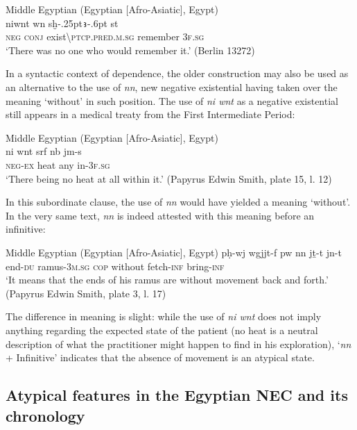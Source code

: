 \documentclass[output=paper]{langsci/langscibook}
\newcommand{\ꜥ}{ʿ}
\newcommand{\ꜣ}{\kern-.25pt\texttt{ꜣ}\kern-.6pt}
\begin{document}
\ea Middle Egyptian (Egyptian [Afro-Asiatic], Egypt) \label{ex:AE48}\\
    \gll niwnt wn sḫ{\ꜣ} st\\
    \textsc{neg} \textsc{conj} exist\textbackslash\textsc{ptcp.pred.m.sg} remember \textsc{3f.sg}\\ 
    \glt ‘There was no one who would remember it.’ (Berlin 13272) 
\z
 
In a syntactic context of dependence, the older construction may also be used as an alternative to the use of \textit{nn}, new negative existential having taken over the meaning ‘without’ in such position. The use of \textit{ni wnt} as a negative existential still appears in a medical treaty from the First Intermediate Period:  
 
\ea Middle Egyptian (Egyptian [Afro-Asiatic], Egypt) \label{ex:AE49}\\
    \gll ni wnt srf nb jm-s\\
    \textsc{neg-ex} heat any in-\textsc{3f.sg}\\ 
    \glt ‘There being no heat at all within it.’ (Papyrus Edwin Smith, plate 15, l. 12) 
\z 
 
In this subordinate clause, the use of \textit{nn} would have yielded a meaning ‘without’. In the very same text, \textit{nn} is indeed attested with this meaning before an infinitive:  
 
\ea Middle Egyptian (Egyptian [Afro-Asiatic], Egypt) \label{ex:AE50}
    \gll pḥ-wj wgjjt-f pw nn jṯ-t jn-t\\
    end-\textsc{du} ramus-\textsc{3m.sg} \textsc{cop} without fetch-\textsc{inf} bring-\textsc{inf}\\ 
    \glt ‘It means that the ends of his ramus are without movement back and forth.’ (Papyrus Edwin Smith, plate 3, l. 17) 
\z 
 
The difference in meaning is slight: while the use of \textit{ni wnt} does not imply anything regarding the expected state of the patient (no heat is a neutral description of what the practitioner might happen to find in his exploration), ‘\textit{nn} + Infinitive’ indicates that the absence of movement is an atypical state.  

\subsection{Atypical features in the Egyptian NEC and its chronology}\label{s:AE3-3}
\end{document}
